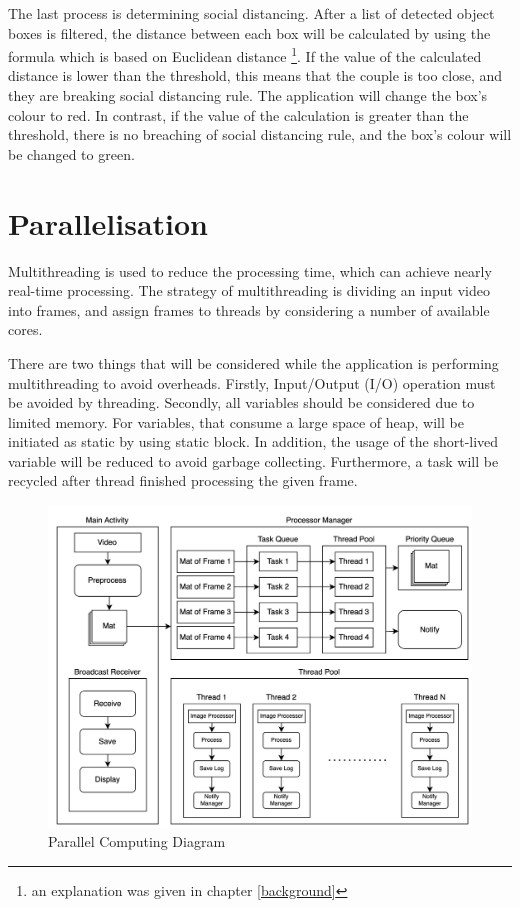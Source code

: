         The last process is determining social distancing.
        After a list of detected object boxes is filtered,
        the distance between each box will be calculated by using the formula which is based on Euclidean distance
        \footnote{an explanation was given in chapter \ref{background}}.
        If the value of the calculated distance is lower than the threshold,
        this means that the couple is too close, and they are breaking social distancing rule.
        The application will change the box's colour to red.
        In contrast, if the value of the calculation is greater than the threshold,
        there is no breaching of social distancing rule, and the box's colour will be changed to green.

    \section{Parallelisation}
        Multithreading is used to reduce the processing time, which can achieve nearly real-time processing.
        The strategy of multithreading is dividing an input video into frames,
        and assign frames to threads by considering a number of available cores.

         There are two things that will be considered while the application is performing multithreading to avoid overheads.
        Firstly, Input/Output (I/O) operation must be avoided by threading.
        Secondly, all variables should be considered due to limited memory.
            For variables, that consume a large space of heap, will be initiated as static by using static block.
            In addition, the usage of the short-lived variable will be reduced to avoid garbage collecting.
            Furthermore, a task will be recycled after thread finished processing the given frame.

        \begin{figure}[!ht]
            \includegraphics[width=6in]{images/chapter3/parallel.png}
            \caption{Parallel Computing Diagram}
            \label{parallelJava}
        \end{figure}

